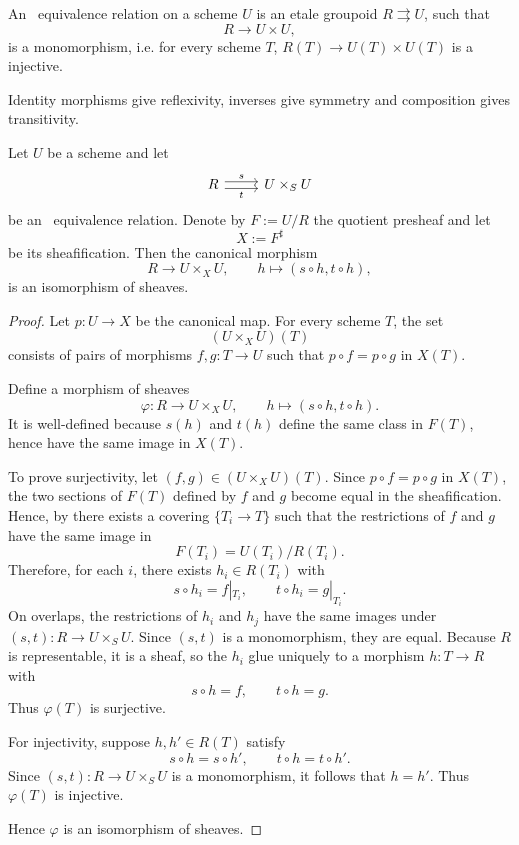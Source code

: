 \begin{definition}
	An \etale\ equivalence relation on a scheme $U$ is an etale groupoid $R\rightrightarrows U$, such that
	\[
		R\rightarrow U\times U,
	\]
	is a monomorphism, i.e. for every scheme $T$, $R(T) \to U(T)\times U(T)$ is a injective.
\end{definition}

\begin{remark}
	Identity morphisms give reflexivity, inverses give symmetry and composition gives transitivity.
\end{remark}


\begin{proposition}\label{prop:etale-quotient-isom}
	Let $U$ be a scheme and let
	\[\begin{tikzcd}
		R & {U\times_S U}
		\arrow["t"', shift right, from=1-1, to=1-2]
		\arrow["s", shift left, from=1-1, to=1-2]
	\end{tikzcd}\]
	be an \etale\ equivalence relation. Denote by $F:=U/R$ the quotient presheaf and let
	\[
	X:=F^\sharp
	\]
	be its sheafification. Then the canonical morphism
	\[
	R \to U\times_X U,\qquad h\mapsto (s\circ h,t\circ h),
	\]
	is an isomorphism of sheaves.
\end{proposition}

\begin{proof}
	Let $p:U\to X$ be the canonical map. For every scheme $T$, the set
	\[
	(U\times_XU)(T)
	\]
	consists of pairs of morphisms $f,g:T\to U$ such that $p\circ f=p\circ g$ in $X(T)$.
	
	Define a morphism of sheaves
	\[
	\varphi:R\to U\times_XU,\qquad h\mapsto (s\circ h,t\circ h).
	\]
	It is well-defined because $s(h)$ and $t(h)$ define the same class in $F(T)$, hence have the same image in $X(T)$.
	
	To prove surjectivity, let $(f,g)\in (U\times_XU)(T)$. Since $p\circ f=p\circ g$ in $X(T)$, the two sections of $F(T)$ defined by $f$ and $g$ become equal in the sheafification. Hence, by \cite[][Tag 00WK]{stacks-project} there exists a covering $\{T_i\to T\}$ such that the restrictions of $f$ and $g$ have the same image in
	\[
	F(T_i)=U(T_i)/R(T_i).
	\]
	Therefore, for each $i$, there exists $h_i\in R(T_i)$ with
	\[
	s\circ h_i=f|_{T_i},\qquad t\circ h_i=g|_{T_i}.
	\]
	On overlaps, the restrictions of $h_i$ and $h_j$ have the same images under $(s,t):R\to U\times_SU$. Since $(s,t)$ is a monomorphism, they are equal. Because $R$ is representable, it is a sheaf, so the $h_i$ glue uniquely to a morphism $h:T\to R$ with
	\[
	s\circ h=f,\qquad t\circ h=g.
	\]
	Thus $\varphi(T)$ is surjective.
	
	For injectivity, suppose $h,h'\in R(T)$ satisfy
	\[
	s\circ h=s\circ h',\qquad t\circ h=t\circ h'.
	\]
	Since $(s,t):R\to U\times_SU$ is a monomorphism, it follows that $h=h'$. Thus $\varphi(T)$ is injective.
	
	Hence $\varphi$ is an isomorphism of sheaves.
\end{proof}





